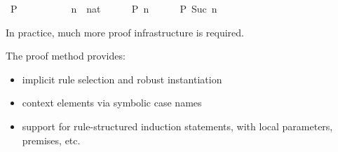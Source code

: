 \begin{isabellebody}
\ {}P\ {}{}\ \isamarkupfalse%
\isanewline
\ \ \isamarkupfalse%
\isanewline
\ \ \ \ \isamarkupfalse%
\ n\ {}{}\ nat\isanewline
\ \ \ \ \isamarkupfalse%
\ {}P\ n{}\isanewline
\ \ \ \ \isamarkupfalse%
\ {}P\ {}Suc\ n{}{}\ \isamarkupfalse%
\isanewline
\ \ \isamarkupfalse%
%
\endisatagproof
{\isafoldproof}%
%
\isadelimproof
\isanewline
%
\endisadelimproof
{}\isamarkupfalse%
%
\begin{isamarkuptext}%
In practice, much more proof infrastructure is required.

  The proof method \hyperlink{method.induct}{\mbox{}} provides:
  \begin{itemize}

  \item implicit rule selection and robust instantiation

  \item context elements via symbolic case names

  \item support for rule-structured induction statements, with local
    parameters, premises, etc.


\end{itemize}
\end{isamarkuptext}
\end{isabellebody}
